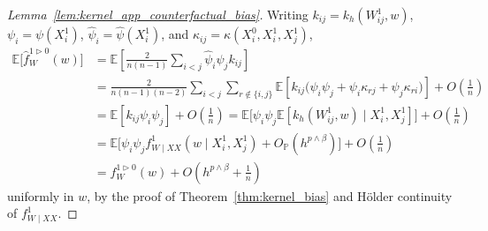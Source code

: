 \documentclass[11pt,lof]{puthesis}
\renewcommand{\P}{\ensuremath{\mathbb{P}}}
\newcommand{\E}{\ensuremath{\mathbb{E}}}
\theoremstyle{break}
\theoremstyle{proof}
\newtheorem{proof}{Proof}
\begin{document}
\begin{proof}[Lemma~\ref{lem:kernel_app_counterfactual_bias}]

Writing
$k_{i j} = k_h(W_{i j}^1, w)$,
$\psi_i = \psi(X_i^1)$,
$\hat\psi_i = \hat\psi(X_i^1)$,
and $\kappa_{i j} = \kappa(X_i^0, X_i^1, X_j^1)$,
%
\begin{align*}
\E\big[\hat f_W^{1 \triangleright 0}(w)\big]
&=
\E\left[
\frac{2}{n(n-1)}
\sum_{i<j}
\hat \psi_i
\hat \psi_j
k_{i j}
\right] \\
&=
\frac{2}{n(n-1)(n-2)}
\sum_{i < j}
\sum_{r \notin \{i,j\}}
\E\left[
k_{i j}
\Big(
\psi_i
\psi_j
+\psi_i
\kappa_{r j}
+\psi_j
\kappa_{r i}
\Big)
\right]
+ O\left(\frac{1}{n}\right) \\
&=
\E\left[
k_{i j}
\psi_i
\psi_j
\right]
+ O\left(\frac{1}{n}\right)
=
\E\big[
\psi_i
\psi_j
\E\left[
k_h(W_{i j}^1, w)
\mid X_i^1, X_j^1
\right]
\big]
+ O\left(\frac{1}{n}\right) \\
&=
\E\big[
\psi_i
\psi_j
f_{W \mid XX}^1(w \mid X_i^1, X_j^1)
+ O_\P\left( h^{p \wedge \beta} \right)
\big]
+ O\left(\frac{1}{n}\right) \\
&=
f_W^{1 \triangleright 0}(w)
+ O\left( h^{p \wedge \beta} + \frac{1}{n}\right)
\end{align*}
%
uniformly in $w$, by the proof of
Theorem~\ref{thm:kernel_bias} and H{\"o}lder continuity
of $f_{W \mid XX}^1$.
%
\end{proof}
\end{document}
